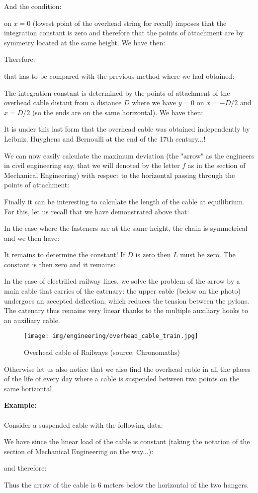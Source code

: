 \begin{itemize}
		And the condition:
		
		on $x=0$ (lowest point of the overhead string for recall) imposes that the integration constant is zero and therefore that the points of attachment are by symmetry located at the same height. We have then:
		
		Therefore:
		
		that has to be compared with the previous method where we had obtained:
		
		The integration constant is determined by the points of attachment of the overhead cable distant from a distance $D$ where we have $y=0$ on $x=-D/2$ and $x=D/2$ (so the ends are on the same horizontal). We have then:
		
		It is under this last form that the overhead cable was obtained independently by Leibniz, Huyghens and Bernoulli at the end of the 17th century...!
	
		We can now easily calculate the maximum deviation (the "arrow" as the engineers in civil engineering say, that we will denoted by the letter $f$ as in the section of Mechanical Engineering) with respect to the horizontal passing through the points of attachment:
		
		Finally it can be interesting to calculate the length of the cable at equilibrium. For this, let us recall that we have demonstrated above that:
		
		In the case where the fasteners are at the same height, the chain is symmetrical and we then have:
		
		It remains to determine the constant! If $D$ is zero then $L$ must be zero. The constant is then zero and it remains:
		
		In the case of electrified railway lines, we solve the problem of the arrow by a main cable that carries of the catenary: the upper cable (below on the photo) undergoes an accepted deflection, which reduces the tension between the pylons. The catenary thus remains very linear thanks to the multiple auxiliary hooks to an auxiliary cable.
		\begin{figure}[H]
			\centering
			\texttt{[image: img/engineering/overhead\_cable\_train.jpg]}
			\caption{Overhead cable of Railways (source: Chronomaths)}
		\end{figure}
		Otherwise let us also notice that we also find the overhead cable in all the places of the life of every day where a cable is suspended between two points on the same horizontal.
		\begin{tcolorbox}[colframe=black,colback=white,sharp corners]
		\textbf{{\Large {}}Example:}\\\\
		Consider a suspended cable with the following data:
		
		We have since the linear load of the cable is constant (taking the notation of the section of Mechanical Engineering on the way...):
		
		and therefore:
		
		Thus the arrow of the cable is $6$ meters below the horizontal of the two hangers.
		\end{tcolorbox}	
	\end{itemize}
	
